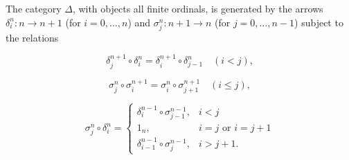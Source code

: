 The category $\Delta$, with objects all finite ordinals, is generated by the arrows $\delta_i^n : n \rightarrow n+1$ (for $i = 0, \ldots, n$) and $\sigma_j^n : n+1 \rightarrow n$ (for $j = 0, \ldots, n-1$) subject to the relations

$$\delta_j^{n+1} \circ \delta_i^n = \delta_i^{n+1} \circ \delta_{j-1}^n \quad (i < j),$$

$$\sigma_j^n \circ \sigma_i^{n+1} = \sigma_i^n \circ \sigma_{j+1}^{n+1} \quad (i \leq j),$$

$$\sigma_j^n \circ \delta_i^n =
\begin{cases}
\delta_i^{n-1} \circ \sigma_{j-1}^{n-1}, & i < j \\
1_n, & i = j \text{ or } i = j+1 \\
\delta_{i-1}^{n-1} \circ \sigma_j^{n-1}, & i > j+1.
\end{cases}$$
